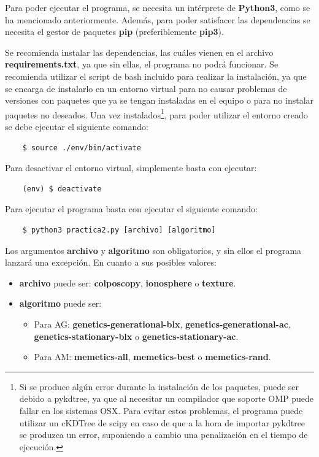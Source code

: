 \documentclass[11pt,a4paper]{article}
\begin{document}
Para poder ejecutar el programa, se necesita un intérprete de \textbf{Python3}, como se ha mencionado anteriormente. Además,
para poder satisfacer las dependencias se necesita el gestor de paquetes \textbf{pip} (preferiblemente \textbf{pip3}).

Se recomienda instalar las dependencias, las cuáles vienen en el archivo \textbf{requirements.txt}, ya que sin ellas, el
programa no podrá funcionar. Se recomienda utilizar el script de bash incluido para realizar la instalación, ya que se
encarga de instalarlo en un entorno virtual para no causar problemas de versiones con paquetes que ya se tengan instaladas en
el equipo o para no instalar paquetes no deseados. Una vez instalados\footnote{Si se produce algún error durante la
instalación de los paquetes, puede ser debido a pykdtree, ya que al necesitar un compilador que soporte OMP puede fallar en
los sistemas OSX. Para evitar estos problemas, el programa puede utilizar un cKDTree de scipy en caso de que a la hora de
importar pykdtree se produzca un error, suponiendo a cambio una penalización en el tiempo de ejecución.}, para poder utilizar
el entorno creado se debe ejecutar el siguiente comando:

\begin{lstlisting}
	$ source ./env/bin/activate
\end{lstlisting}

Para desactivar el entorno virtual, simplemente basta con ejecutar:

\begin{lstlisting}
	(env) $ deactivate
\end{lstlisting}

Para ejecutar el programa basta con ejecutar el siguiente comando:

\begin{lstlisting}
	$ python3 practica2.py [archivo] [algoritmo]
\end{lstlisting}

Los argumentos \textbf{archivo} y \textbf{algoritmo} son obligatorios, y sin ellos el programa lanzará una excepción. En
cuanto a sus posibles valores:

\begin{itemize}[label=\textbullet]
	\item \textbf{archivo} puede ser: \textbf{colposcopy}, \textbf{ionosphere} o \textbf{texture}.
	\item \textbf{algoritmo} puede ser:
	\begin{itemize}[label=$\ast$]
		\item Para AG: \textbf{genetics-generational-blx}, \textbf{genetics-generational-ac},\\
		\textbf{genetics-stationary-blx} o \textbf{genetics-stationary-ac}.
		\item Para AM: \textbf{memetics-all}, \textbf{memetics-best} o \textbf{memetics-rand}.
	\end{itemize}
\end{itemize}
\end{document}
